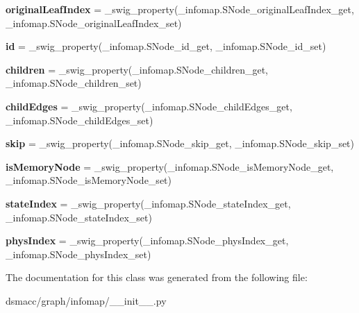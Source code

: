\begin{DoxyCompactItemize}
{\bfseries original\+Leaf\+Index} = \+\_\+swig\+\_\+property(\+\_\+infomap.\+S\+Node\+\_\+original\+Leaf\+Index\+\_\+get, \+\_\+infomap.\+S\+Node\+\_\+original\+Leaf\+Index\+\_\+set)
\item 
\mbox{\label{classdsmacc_1_1graph_1_1infomap_1_1SNode_a89bc6136055b21352d7d455176e8fbff}} 
{\bfseries id} = \+\_\+swig\+\_\+property(\+\_\+infomap.\+S\+Node\+\_\+id\+\_\+get, \+\_\+infomap.\+S\+Node\+\_\+id\+\_\+set)
\item 
\mbox{\label{classdsmacc_1_1graph_1_1infomap_1_1SNode_ae1075aac641db8ba549c1778491e46dc}} 
{\bfseries children} = \+\_\+swig\+\_\+property(\+\_\+infomap.\+S\+Node\+\_\+children\+\_\+get, \+\_\+infomap.\+S\+Node\+\_\+children\+\_\+set)
\item 
\mbox{\label{classdsmacc_1_1graph_1_1infomap_1_1SNode_a4dd95cfe6b8afdc98f979763f1e1e240}} 
{\bfseries child\+Edges} = \+\_\+swig\+\_\+property(\+\_\+infomap.\+S\+Node\+\_\+child\+Edges\+\_\+get, \+\_\+infomap.\+S\+Node\+\_\+child\+Edges\+\_\+set)
\item 
\mbox{\label{classdsmacc_1_1graph_1_1infomap_1_1SNode_a54e72eca796b82cd36d28c2e59983744}} 
{\bfseries skip} = \+\_\+swig\+\_\+property(\+\_\+infomap.\+S\+Node\+\_\+skip\+\_\+get, \+\_\+infomap.\+S\+Node\+\_\+skip\+\_\+set)
\item 
\mbox{\label{classdsmacc_1_1graph_1_1infomap_1_1SNode_a278ef33550bd3e0e42c74422ffb0ba25}} 
{\bfseries is\+Memory\+Node} = \+\_\+swig\+\_\+property(\+\_\+infomap.\+S\+Node\+\_\+is\+Memory\+Node\+\_\+get, \+\_\+infomap.\+S\+Node\+\_\+is\+Memory\+Node\+\_\+set)
\item 
\mbox{\label{classdsmacc_1_1graph_1_1infomap_1_1SNode_a8ba6f09a311e359df20029a57e6a2606}} 
{\bfseries state\+Index} = \+\_\+swig\+\_\+property(\+\_\+infomap.\+S\+Node\+\_\+state\+Index\+\_\+get, \+\_\+infomap.\+S\+Node\+\_\+state\+Index\+\_\+set)
\item 
\mbox{\label{classdsmacc_1_1graph_1_1infomap_1_1SNode_a27da3b9a0f85e1901d0e02e51d6ebbe0}} 
{\bfseries phys\+Index} = \+\_\+swig\+\_\+property(\+\_\+infomap.\+S\+Node\+\_\+phys\+Index\+\_\+get, \+\_\+infomap.\+S\+Node\+\_\+phys\+Index\+\_\+set)
\end{DoxyCompactItemize}


The documentation for this class was generated from the following file\+:\begin{DoxyCompactItemize}
\item 
dsmacc/graph/infomap/\+\_\+\+\_\+init\+\_\+\+\_\+.\+py\end{DoxyCompactItemize}
